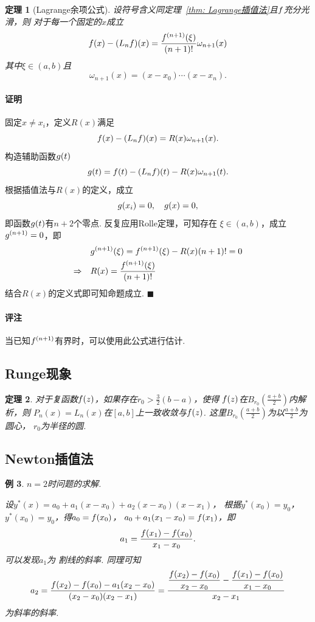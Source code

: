 \documentclass[12pt, a4paper]{article}
\theoremstyle{margin}
\newtheorem{thm}{定理}
\newtheorem{exa}[thm]{例}
\newcommand{\f}{\mathnormal{f}}
\newcommand{\g}{\mathnormal{g}}
\newcommand\thmref[1]{定理~\ref{#1}}
\newcommand{\remark}{\paragraph{评注}}
\newcommand{\proof}{\paragraph{证明}}
\begin{document}
  \begin{thm}[Lagrange余项公式]
    设符号含义同\thmref{thm: Lagrange插值法}且$\f$充分光滑，则
    对于每一个固定的$x$成立
    \[
      \f(x) - (L_n\f)(x) =
      \frac{\f^{(n+1)}(\xi)}{(n+1)!}\omega_{n+1}(x)
    \]
    其中$\xi\in(a, b)$且
    \[
      \omega_{n+1}(x) = (x-x_0)\cdots(x-x_n).
    \]
  \end{thm}
  \proof
    固定$x\ne x_i$，定义$R(x)$满足
    \[
      \f(x) - (L_n\f)(x) = R(x)\omega_{n+1}(x).
    \]
    构造辅助函数$\g(t)$
    \[
      \g(t) = \f(t) - (L_n\f)(t) - R(x)\omega_{n+1}(t).
    \]
    根据插值法与$R(x)$的定义，成立
    \[
      \g(x_i) = 0,\quad g(x) = 0,
    \]
    即函数$\g(t)$有$n+2$个零点. 反复应用Rolle定理，可知存在
    $\xi\in(a, b)$，成立$\g^{(n+1)} = 0$，即
    \[\begin{split}
      & \g^{(n+1)}(\xi) = \f^{(n+1)}(\xi) - R(x)(n+1)! = 0 \\
      \Rightarrow\quad& R(x) = \frac{\f^{(n+1)}(\xi)}{(n+1)!}
    \end{split}\]
    结合$R(x)$的定义式即可知命题成立. $\blacksquare$
  \remark
    当已知$\f^{(n+1)}$有界时，可以使用此公式进行估计.

\subsection{Runge现象}
  \begin{thm}
    对于复函数$\f(z)$，如果存在$r_0>\frac32(b-a)$，使得
    $\f(z)$在$B_{r_0}(\frac{a+b}{2})$内解析，则
    $P_n(x) = L_n(x)$在$[a, b]$上一致收敛与$\f(z)$.
    这里$B_{r_0}(\frac{a+b}{2})$为以$\frac{a+b}{2}$为圆心，
    $r_0$为半径的圆.
  \end{thm}

\subsection{Newton插值法}
  \begin{exa}
    $n=2$时问题的求解. \par
    设$y^*(x) = a_0 + a_1(x-x_0) + a_2(x-x_0)(x-x_1)$，
    根据$y^*(x_0) = y_0$，$y^*(x_0) = y_0$，得$a_0 = \f(x_0)$，
    $a_0 + a_1(x_1-x_0) = \f(x_1)$，即
    \[
      a_1 = \frac{\f(x_1)-\f(x_0)}{x_1 - x_0}.
    \]
    可以发现$a_1$为
    割线的斜率. 同理可知
    \[
      a_2 = \frac{\f(x_2)-\f(x_0)-a_1(x_2-x_0)}{(x_2-x_0)(x_2-x_1)}
      = \frac{\dfrac{\f(x_2) - \f(x_0)}{x_2-x_0} - \dfrac{\f(x_1) - \f(x_0)}{x_1-x_0}}{x_2-x_1}
    \]
    为斜率的斜率.
  \end{exa}
\end{document}

